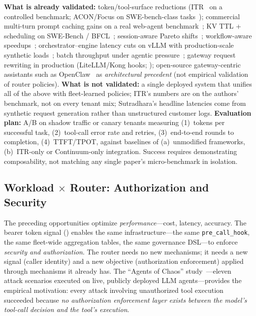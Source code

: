 \begin{opportunity}
\begin{frisk}
\textbf{What is already validated:} token/tool-surface reductions
(ITR~\cite{itr2026} on a controlled benchmark; ACON/Focus on
SWE-bench-class tasks~\cite{acon2025, focus2026}); commercial
multi-turn prompt caching gains on a real web-agent
benchmark~\cite{dontbreakcache2026}; KV TTL + scheduling on SWE-Bench /
BFCL~\cite{continuum2025}; session-aware Pareto shifts~\cite{agserve2025};
workflow-aware speedups~\cite{helium2026}; orchestrator--engine
latency cuts on vLLM with production-scale synthetic
loads~\cite{sutradhara2026}; batch throughput under agentic
pressure~\cite{concur2026}; gateway request rewriting in production (LiteLLM/Kong hooks;
); open-source gateway-centric assistants such as
OpenClaw~\cite{openclaw2026} as \emph{architectural precedent} (not empirical validation of router policies).
\textbf{What is not validated:} a single deployed system that unifies
all of the above with fleet-learned policies; ITR's numbers are on the
authors' benchmark, not on every tenant mix; Sutradhara's headline
latencies come from synthetic request generation rather than
unstructured customer logs.
\textbf{Evaluation plan:} A/B on shadow traffic or canary tenants
measuring (1)~tokens per successful task, (2)~tool-call error rate and
retries, (3)~end-to-end rounds to completion, (4)~TTFT/TPOT, against
baselines of (a)~unmodified frameworks, (b)~ITR-only or Continuum-only
integration.  Success requires demonstrating composability, not
matching any single paper's micro-benchmark in isolation.
\end{frisk}
\end{opportunity}


\subsection{Workload $\times$ Router: Authorization and Security}
\label{sec:vision:auth}

The preceding opportunities optimize \emph{performance}---cost,
latency, accuracy.  The bearer token signal
() enables the same infrastructure---the
same \texttt{pre\_call\_hook}, the same fleet-wide aggregation tables,
the same governance DSL---to enforce \emph{security and
authorization}.  The router needs no new mechanisms; it needs a new
signal (caller identity) and a new objective (authorization
enforcement) applied through mechanisms it already has.  The
``Agents of Chaos'' study~\cite{agentschaos2025}---eleven attack
scenarios executed on live, publicly deployed LLM agents---provides
the empirical motivation: every attack involving unauthorized tool
execution succeeded because \emph{no authorization enforcement layer
exists between the model's tool-call decision and the tool's
execution}.

